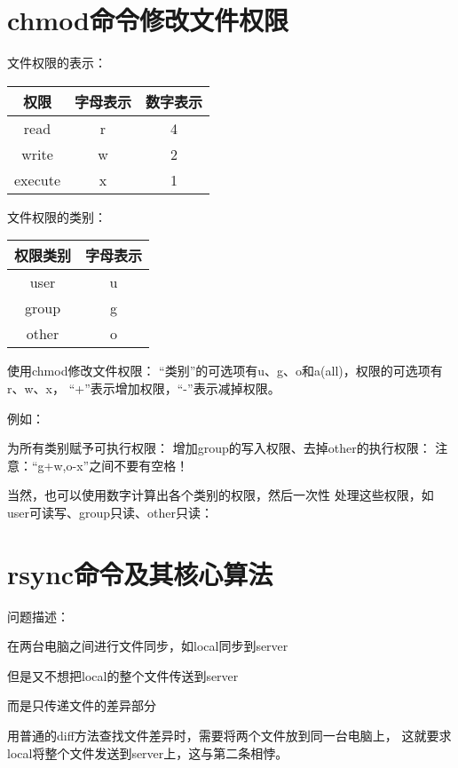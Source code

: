 \documentclass[a4paper,11pt]{article}
\begin{document}
  \section[chmod命令修改文件权限]{chmod命令修改文件权限}
  文件权限的表示：\par
  \begin{center}
  \begin{tabular}{|c|c|c|}
    \hline
    权限 & 字母表示 & 数字表示 \\\hline
    read & r & 4 \\\hline
    write & w & 2 \\\hline
    execute & x & 1 \\\hline
  \end{tabular}
  \end{center}

  文件权限的类别：\par
  \begin{center}
  \begin{tabular}{|c|c|}
    \hline
    权限类别 & 字母表示 \\\hline
    user & u \\\hline
    group & g \\\hline
    other & o \\\hline
  \end{tabular}
  \end{center}

  使用chmod修改文件权限：
  “类别”的可选项有u、g、o和a(all)，权限的可选项有r、w、x，
  “+”表示增加权限，“-”表示减掉权限。

  例如：\par
  为所有类别赋予可执行权限：
  增加group的写入权限、去掉other的执行权限：
  注意：“g+w,o-x”之间不要有空格！

  当然，也可以使用数字计算出各个类别的权限，然后一次性
  处理这些权限，如user可读写、group只读、other只读：


  \section[rsync命令及其核心算法]{rsync命令及其核心算法}
  问题描述：
  \begin{coloredenumerate}
    \item 在两台电脑之间进行文件同步，如local同步到server
    \item 但是又不想把local的整个文件传送到server
    \item 而是只传递文件的差异部分
  \end{coloredenumerate}
  用普通的diff方法查找文件差异时，需要将两个文件放到同一台电脑上，
  这就要求local将整个文件发送到server上，这与第二条相悖。
\end{document}
